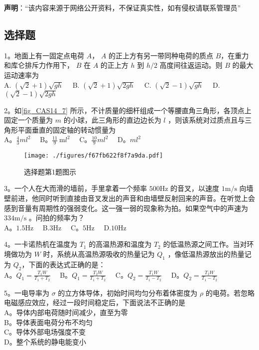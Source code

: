 
\textbf{声明}：“该内容来源于网络公开资料，不保证真实性，如有侵权请联系管理员”

\subsection{选择题}
1。地面上有一固定点电荷 $A$， $A$ 的正上方有另一带同种电荷的质点 $B$，在重力和库仑排斥力作用下， $B$ 在 $A$ 的正上方 $h$ 到 $h/2$ 高度间往返运动。则 $B$ 的最大运动速率为\\
A. $(\sqrt{2}+1) \sqrt{g h}\quad$
B. $(\sqrt{2}+1) \sqrt{2 g h}\quad$
C. $(\sqrt{2}-1) \sqrt{g h}\quad$
D. $(\sqrt{2}-1) \sqrt{2 g h}$

2。如\autoref{fig_CAS14_7} 所示，不计质量的细杆组成一个等腰直角三角形，各顶点上固定一个质量为 $m$ 的小球，此三角形的直边边长为 $l$ ，则该系统对过质点且与三角形平面垂直的固定轴的转动惯量为\\
A。$\frac{4}{3} m l^{2}\quad$
B。$\frac{11}{9} \mathrm{~m} l^{2}\quad$
C。$\frac{10}{9} m l^{2}\quad$
D。$ml^{2}$
\begin{figure}[ht]
\centering
\texttt{[image: ./figures/f67fb622f8f7a9da.pdf]}
\caption{选择题第1题图示} \label{fig_CAS14_7}
\end{figure}
3。一个人在大而滑的墙前，手里拿着一个频率 $500\mathrm{Hz}$ 的音叉，以速度 $1\mathrm{m/s}$ 向墙壁前进，他同时听到直接由音叉发出的声音和由墙壁反射回来的声音。在听觉上会感到音量有周期性的强弱变化。这一强一弱的现象称为拍。如果空气中的声速为 $334\mathrm{m/s}$ 。问拍的频率为？\\
A。$1.5\mathrm{Hz}\quad$ B.$3\mathrm{Hz}\quad$ C。$5\mathrm{Hz}\quad$ D.$10\mathrm{Hz}$

4。一卡诺热机在温度为 $T_1$ 的高温热源和温度为 $T_2$ 的低温热源之间工作。当对环境做功为 $W$ 时，系统从高温热源吸收的热量记为 $Q_1$ ，像低温热源放出的热量记为 $Q_2$，下面的表达式正确的是：\\

A。$Q_1=\frac{T_1W}{T_1+T_2}\quad$ B。$Q_1=\frac{T_2W}{T_1+T_2}\quad$ C。$Q_2=\frac{T_1W}{T_1-T_2}\quad$ D。$Q_2=\frac{T_2W}{T_1-T_2}$

5。一电导率为 $\sigma$ 的立方体导体，初始时间均匀分布着体密度为 $\rho$ 的电荷。若忽略电磁感应效应，经过一段时间稳定后，下面说法不正确的是\\
A。导体内部电荷随时间减少，直至为零\\
B。导体表面电荷分布不均匀\\
C。导体外部电场强度不变\\
D。整个系统的静电能变小

